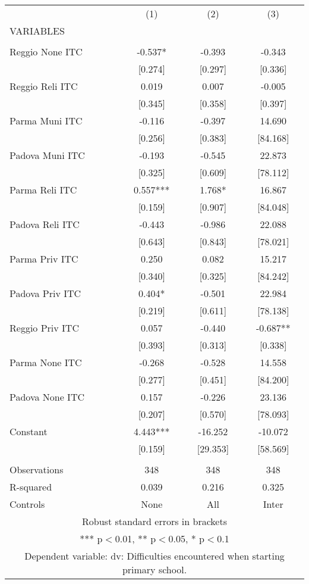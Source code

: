\begin{tabular}{lccc} \hline
 & (1) & (2) & (3) \\
VARIABLES &  &  &  \\ \hline
 &  &  &  \\
Reggio None ITC & -0.537* & -0.393 & -0.343 \\
 & [0.274] & [0.297] & [0.336] \\
Reggio Reli ITC & 0.019 & 0.007 & -0.005 \\
 & [0.345] & [0.358] & [0.397] \\
Parma Muni ITC & -0.116 & -0.397 & 14.690 \\
 & [0.256] & [0.383] & [84.168] \\
Padova Muni ITC & -0.193 & -0.545 & 22.873 \\
 & [0.325] & [0.609] & [78.112] \\
Parma Reli ITC & 0.557*** & 1.768* & 16.867 \\
 & [0.159] & [0.907] & [84.048] \\
Padova Reli ITC & -0.443 & -0.986 & 22.088 \\
 & [0.643] & [0.843] & [78.021] \\
Parma Priv ITC & 0.250 & 0.082 & 15.217 \\
 & [0.340] & [0.325] & [84.242] \\
Padova Priv ITC & 0.404* & -0.501 & 22.984 \\
 & [0.219] & [0.611] & [78.138] \\
Reggio Priv ITC & 0.057 & -0.440 & -0.687** \\
 & [0.393] & [0.313] & [0.338] \\
Parma None ITC & -0.268 & -0.528 & 14.558 \\
 & [0.277] & [0.451] & [84.200] \\
Padova None ITC & 0.157 & -0.226 & 23.136 \\
 & [0.207] & [0.570] & [78.093] \\
Constant & 4.443*** & -16.252 & -10.072 \\
 & [0.159] & [29.353] & [58.569] \\
 &  &  &  \\
Observations & 348 & 348 & 348 \\
R-squared & 0.039 & 0.216 & 0.325 \\
 Controls & None & All & Inter \\ \hline
\multicolumn{4}{c}{ Robust standard errors in brackets} \\
\multicolumn{4}{c}{ *** p$<$0.01, ** p$<$0.05, * p$<$0.1} \\
\multicolumn{4}{c}{ Dependent variable: dv: Difficulties encountered when starting primary school.} \\
\end{tabular}
